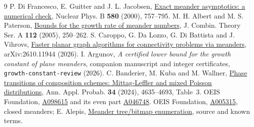 \documentclass[11pt]{article}
\begin{document}
\begin{thebibliography}{9}\small
{} P. Di Francesco, E. Guitter and J. L. Jacobsen, \href{https://arxiv.org/abs/cond-mat/0003008}{Exact meander asymptotics: a numerical check}, Nuclear Phys. B \textbf{580} (2000), 757--795.
 M. H. Albert and M. S. Paterson, \href{https://doi.org/10.1016/j.jcta.2005.02.006}{Bounds for the growth rate of meander numbers}, J. Combin. Theory Ser. A \textbf{112} (2005), 250--262.
 S. Caroppo, G. Da Lozzo, G. Di Battista and J. Vihrovs,
\href{https://arxiv.org/abs/2610.11944}{Faster planar graph algorithms for connectivity problems via meanders}, arXiv:2610.11944 (2026).
 I. Argunov, \emph{A certified lower bound for the growth constant of plane meanders},
companion manuscript and integer certificates, \texttt{growth-constant-review} (2026).
 C. Banderier, M. Kuba and M. Wallner, \href{https://doi.org/10.1214/24-AAP2076}{Phase transitions of composition schemes: Mittag-Leffler and mixed Poisson distributions}, Ann. Appl. Probab. \textbf{34} (2024), 4635--4693, Table~3.
 OEIS Foundation, \href{https://oeis.org/A098615}{A098615} and its even part \href{https://oeis.org/A046748}{A046748}.
 OEIS Foundation, \href{https://oeis.org/A005315}{A005315}, closed meanders; E. Alepis, \href{https://github.com/talepis/meander-tree-bitmap}{Meander tree/bitmap enumeration}, source and known terms.
\end{thebibliography}
\end{document}
